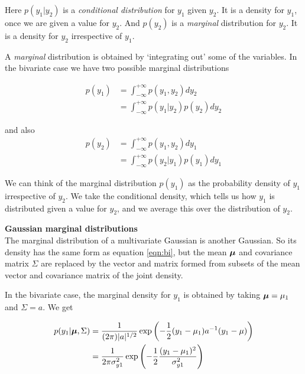 \documentclass[a4paper, 11pt, amsmath, graphicx]{article}\usepackage[]{graphicx}\usepackage[]{color}
\def\bmu{{\mbox{\boldmath $\mu$}}}
\begin{document}
Here $p(y_1|y_2)$ is a \emph{conditional distribution} for $y_1$ given $y_2$. It is a density for $y_1$, once we are given a value for $y_2$. And $p(y_2)$ is a \emph{marginal} distribution for $y_2$. It is a density for $y_2$ irrespective of $y_1$. 

A \emph{marginal} distribution is obtained by `integrating out' some of the variables. In the bivariate case we have two possible marginal distributions

\begin{align}
\label{eqn:cond1}
p(y_1) & = \int_{-\infty}^{+\infty} p(y_1, y_2) dy_2 \\
       & = \int_{-\infty}^{+\infty} p(y_1 | y_2) p(y_2) dy_2
\end{align}

and also
\begin{align}
\label{eqn:cond2}
p(y_2) & = \int_{-\infty}^{+\infty} p(y_1, y_2) dy_1\\
       & = \int_{-\infty}^{+\infty} p(y_2 | y_1) p(y_1) dy_1
\end{align}

We can think of the marginal distribution $p(y_1)$ as the probability density of $y_1$ irrespective of $y_2$. We take the conditional density, which tells us how $y_1$ is distributed given a value for $y_2$, and we average this over the distribution of $y_2$.

\vspace{0.4cm}
\textbf{Gaussian marginal distributions}
\\

The marginal distribution of a multivariate Gaussian is another Gaussian. So its density has the same form as equation \ref{eqn:bi}, but the mean $\bmu$ and covariance matrix $\Sigma$ are replaced by the vector and matrix formed from subsets of the mean vector and covariance matrix of the joint density.

In the bivariate case, the marginal density for $y_1$ is obtained by taking $\bmu = \mu_1$ and $\Sigma = a$. We get

\begin{align}
  p(y_1|\bmu,\Sigma) & = \frac{1}{ (2 \pi) |a|^{1/2} } 
                 \exp \left( - \frac{1}{2} (y_1 - \mu_1)
                 a^{-1} (y_1 - \mu) \right) \\
         & = \frac{1}{ 2 \pi \sigma_{y1}^2 } 
                 \exp \left( - \frac{1}{2} \frac{(y_1 - \mu_1)^2}{\sigma_{y1}^2}
                 \right)
\end{align}
\end{document}
